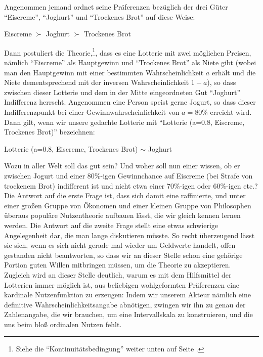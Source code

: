 Angenommen jemand ordnet seine Präferenzen bezüglich der drei Güter "`Eiscreme"',
"`Joghurt"' und "`Trockenes Brot"' auf diese Weise:
\begin{center}
Eiscreme $\succ$ Joghurt $\succ$ Trockenes Brot
\end{center}
Dann postuliert die Theorie,\footnote{Siehe die "`Kontinuitätsbedingung"'
weiter unten auf Seite \pageref{Kontinuitaet}.}, dass es eine Lotterie mit zwei
möglichen Preisen, nämlich "`Eiscreme"' als Hauptgewinn und
"`Trockenes Brot"' als Niete gibt (wobei man den Hauptgewinn mit einer
bestimmten Wahrscheinlichkeit $a$ erhält und die Niete dementsprechend mit der
inversen Wahrscheinlichkeit $1-a$), so dass zwischen dieser Lotterie und dem in
der Mitte eingeordneten Gut "`Joghurt"' Indifferenz herrscht. Angenommen eine
Person speist gerne Jogurt, so dass dieser Indifferenzpunkt bei einer
Gewinnwahrscheinlichkeit von $a=80\% $ erreicht wird. Dann gilt, wenn wir
unsere gedachte Lotterie mit "`Lotterie (a=0.8, Eiscreme, Trockenes Brot)"'
bezeichnen:
\begin{center}
Lotterie (a=0.8, Eiscreme, Trockenes Brot) $\sim$ Joghurt
\end{center}
Wozu in aller Welt soll das gut sein? Und woher soll nun einer wissen, ob
er zwischen Jogurt und einer 80\%-igen Gewinnchance auf Eiscreme (bei Strafe von
trockenem Brot) indifferent ist und nicht etwa einer 70\%-igen oder 60\%-igen
etc.? Die Antwort auf die erste Frage ist, dass sich damit eine raffinierte,
und unter einer großen Gruppe von Ökonomen und einer kleinen Gruppe von
Philosophen überaus populäre Nutzentheorie aufbauen lässt, die wir gleich
kennen lernen werden. Die Antwort auf die zweite Frage stellt eine etwas
schwierige Angelegenheit dar, die man lange diskutieren müsste. So recht
überzeugend lässt sie sich, wenn es sich nicht gerade mal wieder um Geldwerte
handelt, offen gestanden nicht beantworten, so dass wir an dieser Stelle schon
eine gehörige Portion guten Willen mitbringen müssen, um die Theorie zu
akzeptieren. Zugleich wird an dieser Stelle deutlich, warum es mit dem 
Hilfsmittel der Lotterien immer möglich ist, aus beliebigen wohlgeformten
Präferenzen eine kardinale Nutzenfunktion zu erzeugen: Indem wir unserem Akteur 
nämlich eine definitive Wahrscheinlichkeitsangabe abnötigen, zwingen wir ihn zu
genau der Zahlenangabe, die wir brauchen, um eine Intervallskala zu konstruieren, 
und die uns beim bloß ordinalen Nutzen fehlt. 

